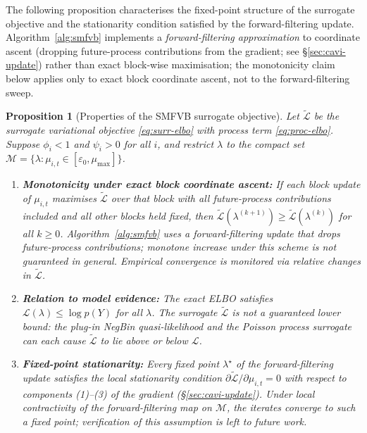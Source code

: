 \documentclass[review,12pt]{elsarticle}
\newtheorem{proposition}[theorem]{Proposition}
\theoremstyle{definition}
\begin{document}
The following proposition characterises the fixed-point structure of the
surrogate objective and the stationarity condition satisfied by the forward-filtering
update.  Algorithm~\ref{alg:smfvb} implements a \emph{forward-filtering
approximation} to coordinate ascent (dropping future-process contributions
from the gradient; see \S\ref{sec:cavi-update}) rather than exact block-wise
maximisation; the monotonicity claim below applies only to exact block
coordinate ascent, not to the forward-filtering sweep.

\begin{proposition}[Properties of the SMFVB surrogate objective]\label{thm:vi-converge}
Let $\tilde{\mathcal{L}}$ be the surrogate variational objective
\eqref{eq:surr-elbo} with process term \eqref{eq:proc-elbo}.  Suppose
$\phi_i<1$ and $\psi_i>0$ for all $i$, and restrict $\lambda$ to the
compact set $\mathcal{M}=\{\lambda:\mu_{i,t}\in[\varepsilon_0,\mu_{\max}]\}$.
\begin{enumerate}[label=(\roman*)]
\item \textbf{Monotonicity under exact block coordinate ascent:}
If each block update of $\mu_{i,t}$ maximises $\tilde{\mathcal{L}}$ over
that block with all future-process contributions included and all
other blocks held fixed, then
$\tilde{\mathcal{L}}(\lambda^{(k+1)})\ge\tilde{\mathcal{L}}(\lambda^{(k)})$
for all $k\ge0$.
\emph{Algorithm~\ref{alg:smfvb} uses a forward-filtering update that drops
future-process contributions; monotone increase under this scheme is not
guaranteed in general.  Empirical convergence is monitored via relative
changes in $\tilde{\mathcal{L}}$.}
\item \textbf{Relation to model evidence:}
The exact ELBO satisfies $\mathcal{L}(\lambda)\le\log p(Y)$ for all
$\lambda$.  The surrogate $\tilde{\mathcal{L}}$ is not a guaranteed
lower bound: the plug-in NegBin quasi-likelihood and the Poisson process
surrogate can each cause $\tilde{\mathcal{L}}$ to lie above or below
$\mathcal{L}$.
\item \textbf{Fixed-point stationarity:} Every fixed point $\lambda^\star$
of the forward-filtering update satisfies the local stationarity
condition $\partial\tilde{\mathcal{L}}/\partial\mu_{i,t}=0$ with
respect to components (1)--(3) of the gradient (\S\ref{sec:cavi-update}).
Under local contractivity of the forward-filtering map on $\mathcal{M}$,
the iterates converge to such a fixed point; verification of this
assumption is left to future work.
\end{enumerate}
\end{proposition}
\end{document}
